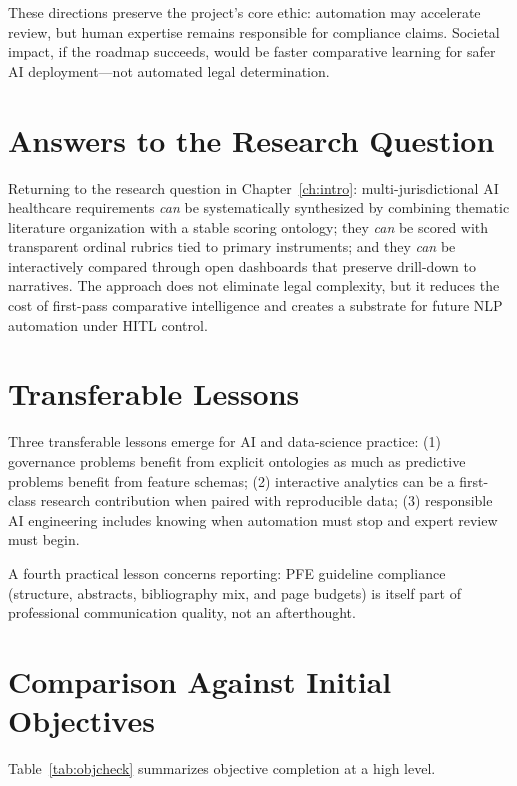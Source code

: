 These directions preserve the project's core ethic: automation may accelerate review, but human expertise remains responsible for compliance claims. Societal impact, if the roadmap succeeds, would be faster comparative learning for safer AI deployment---not automated legal determination.

\section{Answers to the Research Question}
\label{sec:answer}

Returning to the research question in Chapter~\ref{ch:intro}: multi-jurisdictional AI healthcare requirements \emph{can} be systematically synthesized by combining thematic literature organization with a stable scoring ontology; they \emph{can} be scored with transparent ordinal rubrics tied to primary instruments; and they \emph{can} be interactively compared through open dashboards that preserve drill-down to narratives. The approach does not eliminate legal complexity, but it reduces the cost of first-pass comparative intelligence and creates a substrate for future NLP automation under HITL control.

\section{Transferable Lessons}
\label{sec:lessons}

Three transferable lessons emerge for AI and data-science practice: (1) governance problems benefit from explicit ontologies as much as predictive problems benefit from feature schemas; (2) interactive analytics can be a first-class research contribution when paired with reproducible data; (3) responsible AI engineering includes knowing when automation must stop and expert review must begin.

A fourth practical lesson concerns reporting: PFE guideline compliance (structure, abstracts, bibliography mix, and page budgets) is itself part of professional communication quality, not an afterthought.

\section{Comparison Against Initial Objectives}
\label{sec:objcheck}

Table~\ref{tab:objcheck} summarizes objective completion at a high level.

